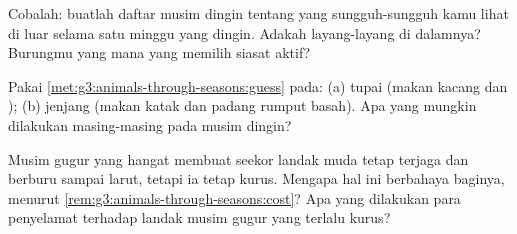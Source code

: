 \begin{exercise}[$\star$]\label{exo:g3:animals-through-seasons:8}
Cobalah: buatlah daftar musim dingin tentang  yang
sungguh-sungguh kamu lihat di luar selama satu minggu yang dingin.
Adakah  layang-layang di dalamnya? Burungmu yang mana yang
memilih siasat aktif?
\end{exercise}

\begin{exercise}[$\star\star$]\label{exo:g3:animals-through-seasons:9}
Pakai \cref{met:g3:animals-through-seasons:guess} pada: (a) tupai
(makan kacang dan ); (b)  jenjang (makan katak dan 
padang rumput basah). Apa yang mungkin dilakukan masing-masing pada
musim dingin?
\end{exercise}

\begin{exercise}[$\star\star$]\label{exo:g3:animals-through-seasons:10}
Musim gugur yang hangat membuat seekor landak muda tetap terjaga dan
berburu sampai larut, tetapi ia tetap kurus. Mengapa hal ini berbahaya
baginya, menurut \cref{rem:g3:animals-through-seasons:cost}? Apa yang
dilakukan para penyelamat  terhadap landak musim gugur yang
terlalu kurus?
\end{exercise}
